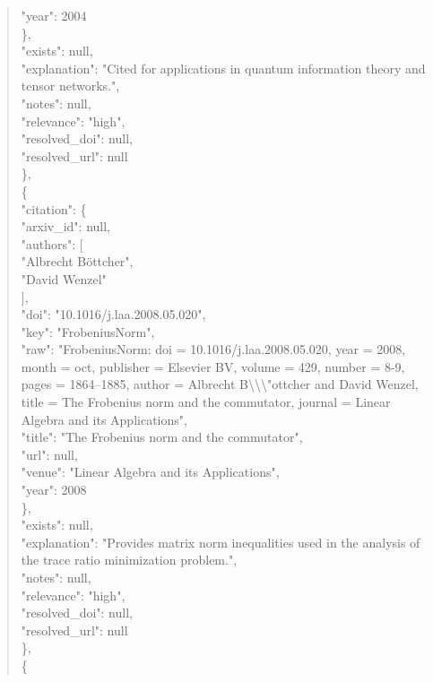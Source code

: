\documentclass[11pt]{article}
\begin{document}
\begin{quote}
        "year": 2004\\
      \},\\
      "exists": null,\\
      "explanation": "Cited for applications in quantum information theory and tensor networks.",\\
      "notes": null,\\
      "relevance": "high",\\
      "resolved\_doi": null,\\
      "resolved\_url": null\\
    \},\\
    \{\\
      "citation": \{\\
        "arxiv\_id": null,\\
        "authors": [\\
          "Albrecht Böttcher",\\
          "David Wenzel"\\
        ],\\
        "doi": "10.1016/j.laa.2008.05.020",\\
        "key": "FrobeniusNorm",\\
        "raw": "FrobeniusNorm: doi = 10.1016/j.laa.2008.05.020, year = 2008, month = oct, publisher = Elsevier BV, volume = 429, number = 8-9, pages = 1864--1885, author = Albrecht B\textbackslash{}\textbackslash{}\textbackslash{}"ottcher and David Wenzel, title = The Frobenius norm and the commutator, journal = Linear Algebra and its Applications",\\
        "title": "The Frobenius norm and the commutator",\\
        "url": null,\\
        "venue": "Linear Algebra and its Applications",\\
        "year": 2008\\
      \},\\
      "exists": null,\\
      "explanation": "Provides matrix norm inequalities used in the analysis of the trace ratio minimization problem.",\\
      "notes": null,\\
      "relevance": "high",\\
      "resolved\_doi": null,\\
      "resolved\_url": null\\
    \},\\
    \{\\

\end{quote}
\end{document}
